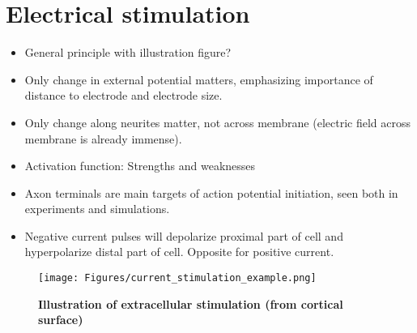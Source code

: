 \section{Electrical stimulation}

\begin{itemize}
\item General principle with illustration figure?
\item Only change in external potential matters, emphasizing importance of distance to electrode and electrode size.
\item Only change along neurites matter, not across membrane (electric field across membrane is already immense).
\item Activation function: Strengths and weaknesses
\item Axon terminals are main targets of action potential initiation, seen both in experiments and simulations.
\item Negative current pulses will depolarize proximal part of cell and hyperpolarize distal part of cell. Opposite for positive current.
\end{itemize}

\begin{figure}[!ht]
\begin{center}
\texttt{[image: Figures/current\_stimulation\_example.png]}
\end{center}
\caption{\textbf{Illustration of extracellular stimulation (from cortical surface)} 
}
\label{fig:Knallfigur}
\end{figure}
